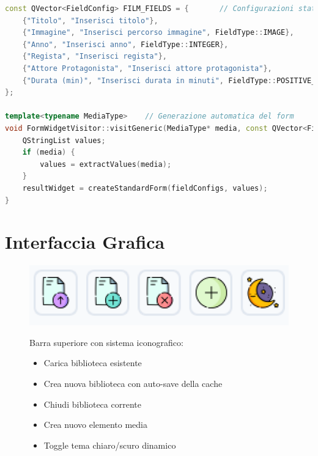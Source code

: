 \documentclass[a4paper,10pt]{article}
\begin{document}
\begin{lstlisting}[language=cpp, style=cppstyle]
const QVector<FieldConfig> FILM_FIELDS = {       // Configurazioni statiche per ogni tipo di media
    {"Titolo", "Inserisci titolo"},
    {"Immagine", "Inserisci percorso immagine", FieldType::IMAGE},
    {"Anno", "Inserisci anno", FieldType::INTEGER},
    {"Regista", "Inserisci regista"},
    {"Attore Protagonista", "Inserisci attore protagonista"},
    {"Durata (min)", "Inserisci durata in minuti", FieldType::POSITIVE_INTEGER}
};

template<typename MediaType>    // Generazione automatica del form
void FormWidgetVisitor::visitGeneric(MediaType* media, const QVector<FieldConfig>& fieldConfigs) {
    QStringList values;
    if (media) {
        values = extractValues(media);
    }
    resultWidget = createStandardForm(fieldConfigs, values);
}
\end{lstlisting}

\newpage

\section{Interfaccia Grafica}

\begin{figure}[ht!]
    \centering
    \begin{minipage}{0.4\textwidth}
        \includegraphics[width=\linewidth]{img/TopButton.png}
    \end{minipage}\hfill
    \begin{minipage}{0.55\textwidth}
        \small
        Barra superiore con sistema iconografico:
        \begin{itemize}
            \item Carica biblioteca esistente
            \item Crea nuova biblioteca con auto-save della cache
            \item Chiudi biblioteca corrente
            \item Crea nuovo elemento media
            \item Toggle tema chiaro/scuro dinamico
        \end{itemize}
    \end{minipage}
\end{figure}
\end{document}
